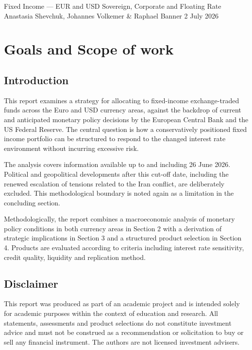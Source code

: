 \documentclass[11pt,a4paper]{article}
\begin{document}
%
{Fixed Income --- EUR and USD Sovereign, Corporate and Floating Rate}%
{Anastasia Shevchuk, Johannes Volkemer \& Raphael Banner}%
{2 July 2026}%
{\relax}

\setcounter{tocdepth}{2}
\tableofcontents
\clearpage

\section{Goals and Scope of work}

\subsection{Introduction}

This report examines a strategy for allocating to fixed-income exchange-traded funds across the Euro and USD currency areas, against the backdrop of current and anticipated monetary policy decisions by the European Central Bank and the US Federal Reserve. The central question is how a conservatively positioned fixed income portfolio can be structured to respond to the changed interest rate environment without incurring excessive risk.

The analysis covers information available up to and including 26 June 2026. Political and geopolitical developments after this cut-off date, including the renewed escalation of tensions related to the Iran conflict, are deliberately excluded. This methodological boundary is noted again as a limitation in the concluding section.

Methodologically, the report combines a macroeconomic analysis of monetary policy conditions in both currency areas in Section 2 with a derivation of strategic implications in Section 3 and a structured product selection in Section 4. Products are evaluated according to criteria including interest rate sensitivity, credit quality, liquidity and replication method.

\subsection{Disclaimer}

This report was produced as part of an academic project and is intended solely for academic purposes within the context of education and research. All statements, assessments and product selections do not constitute investment advice and must not be construed as a recommendation or solicitation to buy or sell any financial instrument. The authors are not licensed investment advisers.
\end{document}
